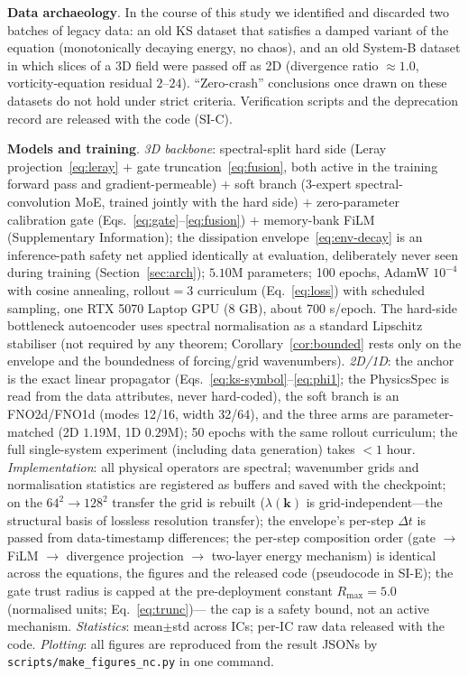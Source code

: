 \documentclass[11pt,a4paper]{article}
\begin{document}
\textbf{Data archaeology}. In the course of this study we identified and discarded two batches of legacy data: an old KS dataset that satisfies a damped variant of the equation (monotonically decaying energy, no chaos), and an old System-B dataset in which slices of a 3D field were passed off as 2D (divergence ratio $\approx1.0$, vorticity-equation residual $2$--$24$). ``Zero-crash'' conclusions once drawn on these datasets do not hold under strict criteria. Verification scripts and the deprecation record are released with the code (SI-C).

\textbf{Models and training}. \emph{3D backbone}: spectral-split hard side (Leray projection~\eqref{eq:leray} $+$ gate truncation~\eqref{eq:fusion}, both active in the training forward pass and gradient-permeable) $+$ soft branch (3-expert spectral-convolution MoE, trained jointly with the hard side) $+$ zero-parameter calibration gate (Eqs.~\eqref{eq:gate}--\eqref{eq:fusion}) $+$ memory-bank FiLM (Supplementary Information); the dissipation envelope~\eqref{eq:env-decay} is an inference-path safety net applied identically at evaluation, deliberately never seen during training (Section~\ref{sec:arch}); $5.10$M parameters; 100 epochs, AdamW $10^{-4}$ with cosine annealing, rollout$=3$ curriculum (Eq.~\eqref{eq:loss}) with scheduled sampling, one RTX 5070 Laptop GPU (8 GB), about 700 s/epoch. The hard-side bottleneck autoencoder uses spectral normalisation as a standard Lipschitz stabiliser (not required by any theorem; Corollary~\ref{cor:bounded} rests only on the envelope and the boundedness of forcing/grid wavenumbers). \emph{2D/1D}: the anchor is the exact linear propagator (Eqs.~\eqref{eq:ks-symbol}--\eqref{eq:phi1}; the PhysicsSpec is read from the data attributes, never hard-coded), the soft branch is an FNO2d/FNO1d (modes 12/16, width 32/64), and the three arms are parameter-matched (2D $1.19$M, 1D $0.29$M); 50 epochs with the same rollout curriculum; the full single-system experiment (including data generation) takes $<1$ hour. \emph{Implementation}: all physical operators are spectral; wavenumber grids and normalisation statistics are registered as buffers and saved with the checkpoint; on the $64^2{\to}128^2$ transfer the grid is rebuilt ($\lambda(\bm{k})$ is grid-independent---the structural basis of lossless resolution transfer); the envelope's per-step $\Delta t$ is passed from data-timestamp differences; the per-step composition order (gate $\rightarrow$ FiLM $\rightarrow$ divergence projection $\rightarrow$ two-layer energy mechanism) is identical across the equations, the figures and the released code (pseudocode in SI-E); the gate trust radius is capped at the pre-deployment constant $R_{\max}=5.0$ (normalised units; Eq.~\eqref{eq:trunc})---%
the cap is a safety bound, not an active mechanism. \emph{Statistics}: mean$\pm$std across ICs; per-IC raw data released with the code. \emph{Plotting}: all figures are reproduced from the result JSONs by \texttt{scripts/make\_figures\_nc.py} in one command.
\end{document}
